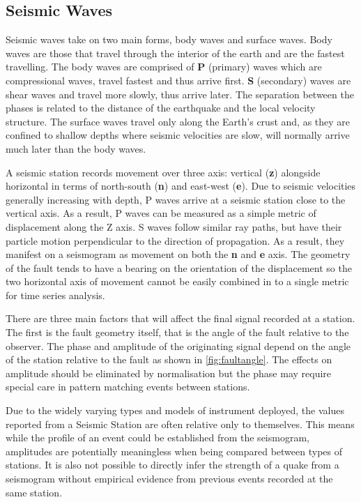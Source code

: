 \documentclass[../report.tex]{subfiles}
\begin{document}
	
\subsection{Seismic Waves} \label{sec:seismicwaves}
	Seismic waves take on two main forms, body waves and surface waves.  Body waves are those that travel through the interior of the earth and are the fastest travelling.  The body waves are comprised of \textbf{P} (primary) waves which are compressional waves, travel fastest and thus arrive first.  \textbf{S} (secondary) waves are shear waves and travel more slowly, thus arrive later.  The separation between the phases is related to the distance of the earthquake and the local velocity structure. The surface waves travel only along the Earth's crust and, as they are confined to shallow depths where seismic velocities are slow, will normally arrive much later than the body waves.
	
	A seismic station records movement over three axis: vertical (\textbf{z}) alongside horizontal in terms of north-south (\textbf{n}) and east-west (\textbf{e}).  Due to seismic velocities generally increasing with depth, P waves arrive at a seismic station close to the vertical axis.  As a result, P waves can be measured as a simple metric of displacement along the Z axis.  S waves follow similar ray paths, but have their particle motion perpendicular to the direction of propagation.  As a result, they manifest on a seismogram as movement on both the \textbf{n} and \textbf{e} axis. The geometry of the fault tends to have a bearing on the orientation of the displacement so the two horizontal axis of movement cannot be easily combined in to a single metric for time series analysis.
	
	There are three main factors that will affect the final signal recorded at a station.  The first is the fault geometry itself, that is the angle of the fault relative to the observer.  The phase and amplitude of the originating signal depend on the angle of the station relative to the fault as shown in \cref{fig:faultangle}.  The effects on amplitude should be eliminated by normalisation but the phase may require special care in pattern matching events between stations.
	
	Due to the widely varying types and models of instrument deployed, the values reported from a Seismic Station are often relative only to themselves.  This means while the profile of an event could be established from the seismogram, amplitudes are potentially meaningless when being compared between types of stations.  It is also not possible to directly infer the strength of a quake from a seismogram without empirical evidence from previous events recorded at the same station.
	
\end{document}
